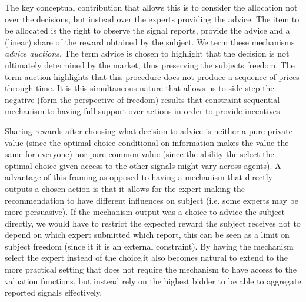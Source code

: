 


The key conceptual contribution that allows this is to consider the allocation not over the decisions, but instead over the experts providing the advice. 
The item to be allocated is the right to observe the signal reports, provide the advice and a (linear) share of the reward obtained by the subject.
We term these mechanisms \emph{advice auctions}.
The term advice is chosen to highlight that the decision is not ultimately determined by the market, thus preserving the subjects freedom.
The term auction highlights that this procedure does not produce a sequence of prices through time.
It is this simultaneous nature that allows us to side-step the negative (form the perspective of freedom) results that constraint sequential mechanism to having full support over actions in order to provide  incentives.

Sharing rewards after choosing what decision to advice is neither a pure private value (since the optimal choice conditional on information makes the value the same for everyone) nor pure common value (since the ability the select the optimal choice given access to the other signals might vary across agents).
A advantage of this framing as opposed to having a mechanism that directly outputs a chosen action is that it allows for the expert making the recommendation to have different influences on subject (i.e. some experts may be more persuasive).
If the mechanism output was a choice to advice the subject directly, we would have to restrict the expected reward the subject receives not to depend on which expert submitted which report, this can be seen as  a limit on subject freedom (since it it is an external constraint).
By having the mechanism select the expert instead of the choice,it also becomes natural to extend to the more practical setting that does not require the mechanism to have access to the valuation functions, but instead rely on the highest bidder to be able to aggregate reported signals effectively.



